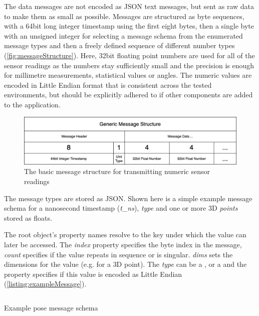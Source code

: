 The data messages are not encoded as \ac{JSON} text messages, but sent as raw data to make them as small as possible.
Messages are structured as byte sequences, with a 64bit long integer timestamp using the first eight bytes, then a single byte with an unsigned integer for selecting a message schema from the enumerated message types and then a freely defined sequence of different number types (\autoref{fig:messageStructure}). Here, 32bit floating point numbers are used for all of the sensor readings as the numbers stay sufficiently small and the precision is enough for millimetre measurements, statistical values or angles.
The numeric values are encoded in Little Endian format that is consistent across the tested environments, but should be explicitly adhered to if other components are added to the application.

\begin{figure}[h]
\centering
\includegraphics[width=\textwidth]{04_Artefakte/01_Abbildungen/generic-message-structure}
\caption[Generic Message Structure]{The basic message structure for transmitting numeric sensor readings\protect}
\label{fig:messageStructure}
\end{figure}

The message types are stored as JSON. Shown here is a simple example message schema for a nanosecond timestamp (\emph{{t\_ns}}), \emph{type} and one or more \ac{3D} \emph{points} stored as floats.

The root object's property names resolve to the key under which the value can later be accessed.
The \emph{index} property specifies the byte index in the message, \emph{count} specifies if the value repeats in sequence or is singular. \emph{dims} sets the dimensions for the value (e.g.  for a \ac{3D} point).
The \emph{type} can be a ,  or a  and the property  specifies if this value is encoded as Little Endian (\autoref{listing:exampleMessage}).

\begin{listing}[!ht]
\inputminted{json}{04_Artefakte/03_Listings/example-pose-message.json}
\caption{Example pose message schema}
\label{listing:exampleMessage}
\end{listing}
